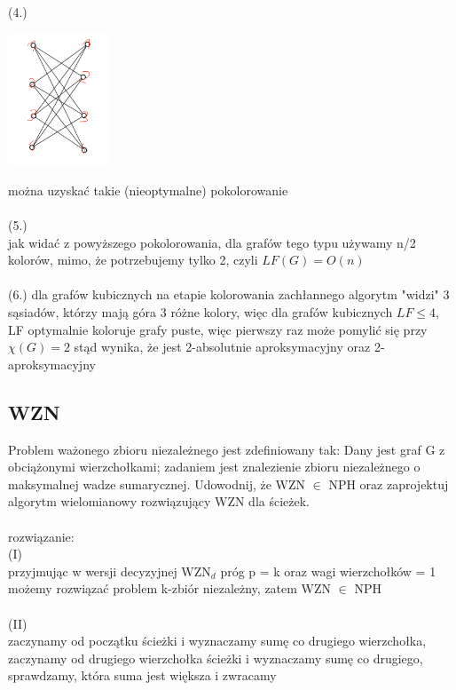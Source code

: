 \documentclass{article}
\begin{document}
(4.) \\
 \begin{center}
\includegraphics[width=3cm]{pokolorowany_jordan}
\end{center}
można uzyskać takie (nieoptymalne) pokolorowanie \\\\
(5.) \\
jak widać z powyższego pokolorowania, dla grafów tego typu używamy n/2 kolorów, mimo, że potrzebujemy tylko 2, czyli
$LF(G) = O(n)$ \\\\
(6.)
dla grafów kubicznych na etapie kolorowania zachłannego algorytm "widzi" 3 sąsiadów, którzy mają góra 3 różne kolory, więc 
dla grafów kubicznych $LF \leq 4$, LF optymalnie koloruje grafy puste, więc pierwszy raz może pomylić się przy $\chi(G) = 2$
stąd wynika, że jest 2-absolutnie aproksymacyjny oraz 2-aproksymacyjny

\subsection*{WZN}
Problem ważonego zbioru niezależnego jest zdefiniowany tak: Dany jest graf G z obciążonymi wierzchołkami; zadaniem jest znalezienie
zbioru niezależnego o maksymalnej wadze sumarycznej.  Udowodnij, że WZN $\in$ NPH oraz zaprojektuj algorytm wielomianowy 
rozwiązujący WZN dla ścieżek. \\\\rozwiązanie:\\
(I) \\
przyjmując w wersji decyzyjnej WZN$_d$ próg p = k oraz wagi wierzchołków = 1 możemy rozwiązać problem k-zbiór niezależny, zatem
WZN $\in$ NPH \\\\
(II) \\
zaczynamy od początku ścieżki i wyznaczamy sumę co drugiego wierzchołka, zaczynamy od drugiego wierzchołka ścieżki i wyznaczamy sumę co drugiego, 
sprawdzamy, która suma jest większa i zwracamy
\end{document}
